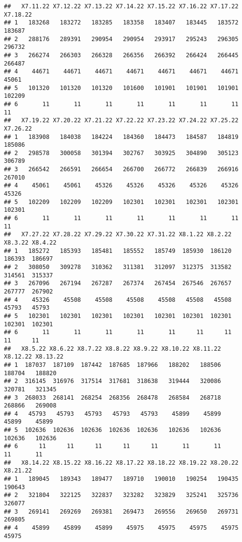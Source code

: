 \documentclass[
]{article}
\begin{document}
\begin{verbatim}
##   X7.11.22 X7.12.22 X7.13.22 X7.14.22 X7.15.22 X7.16.22 X7.17.22 X7.18.22
## 1   183268   183272   183285   183358   183407   183445   183572   183687
## 2   288176   289391   290954   290954   293917   295243   296305   296732
## 3   266274   266303   266328   266356   266392   266424   266445   266487
## 4    44671    44671    44671    44671    44671    44671    44671    45061
## 5   101320   101320   101320   101600   101901   101901   101901   102209
## 6       11       11       11       11       11       11       11       11
##   X7.19.22 X7.20.22 X7.21.22 X7.22.22 X7.23.22 X7.24.22 X7.25.22 X7.26.22
## 1   183908   184038   184224   184360   184473   184587   184819   185086
## 2   298578   300058   301394   302767   303925   304890   305123   306789
## 3   266542   266591   266654   266700   266772   266839   266916   267010
## 4    45061    45061    45326    45326    45326    45326    45326    45326
## 5   102209   102209   102209   102301   102301   102301   102301   102301
## 6       11       11       11       11       11       11       11       11
##   X7.27.22 X7.28.22 X7.29.22 X7.30.22 X7.31.22 X8.1.22 X8.2.22 X8.3.22 X8.4.22
## 1   185272   185393   185481   185552   185749  185930  186120  186393  186697
## 2   308050   309278   310362   311381   312097  312375  313582  314561  315337
## 3   267096   267194   267287   267374   267454  267546  267657  267777  267902
## 4    45326    45508    45508    45508    45508   45508   45508   45793   45793
## 5   102301   102301   102301   102301   102301  102301  102301  102301  102301
## 6       11       11       11       11       11      11      11      11      11
##   X8.5.22 X8.6.22 X8.7.22 X8.8.22 X8.9.22 X8.10.22 X8.11.22 X8.12.22 X8.13.22
## 1  187037  187109  187442  187685  187966   188202   188506   188704   188820
## 2  316145  316976  317514  317681  318638   319444   320086   320781   321345
## 3  268033  268141  268254  268356  268478   268584   268718   268866   269008
## 4   45793   45793   45793   45793   45793    45899    45899    45899    45899
## 5  102636  102636  102636  102636  102636   102636   102636   102636   102636
## 6      11      11      11      11      11       11       11       11       11
##   X8.14.22 X8.15.22 X8.16.22 X8.17.22 X8.18.22 X8.19.22 X8.20.22 X8.21.22
## 1   189045   189343   189477   189710   190010   190254   190435   190643
## 2   321804   322125   322837   323282   323829   325241   325736   326077
## 3   269141   269269   269381   269473   269556   269650   269731   269805
## 4    45899    45899    45899    45975    45975    45975    45975    45975

\end{verbatim}
\end{document}
